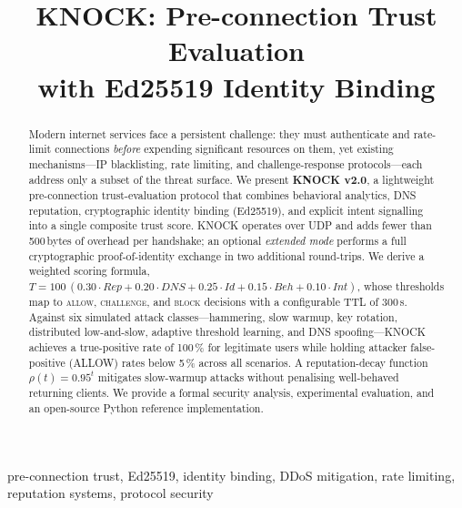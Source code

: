 \documentclass[10pt,conference]{IEEEtran}
\begin{document}
\title{KNOCK: Pre-connection Trust Evaluation\\
       with Ed25519 Identity Binding}

\author{
}

\maketitle

\begin{abstract}
Modern internet services face a persistent challenge: they must
authenticate and rate-limit connections \emph{before} expending
significant resources on them, yet existing mechanisms—IP blacklisting,
rate limiting, and challenge-response protocols—each address only a
subset of the threat surface.  We present \textbf{KNOCK v2.0}, a
lightweight pre-connection trust-evaluation protocol that combines
behavioral analytics, DNS reputation, cryptographic identity binding
(Ed25519), and explicit intent signalling into a single composite
trust score.  KNOCK operates over UDP and adds fewer than 500\,bytes of
overhead per handshake; an optional \emph{extended mode} performs a
full cryptographic proof-of-identity exchange in two additional
round-trips.  We derive a weighted scoring formula,
$T = 100\,(0.30 \cdot \mathit{Rep} + 0.20 \cdot \mathit{DNS}
         + 0.25 \cdot \mathit{Id} + 0.15 \cdot \mathit{Beh}
         + 0.10 \cdot \mathit{Int})$,
whose thresholds map to \textsc{allow}, \textsc{challenge}, and
\textsc{block} decisions with a configurable TTL of 300\,s.  Against
six simulated attack classes—hammering, slow warmup, key rotation,
distributed low-and-slow, adaptive threshold learning, and DNS
spoofing—KNOCK achieves a true-positive rate of 100\,\% for legitimate
users while holding attacker false-positive (ALLOW) rates below 5\,\%
across all scenarios.  A reputation-decay function $\rho(t)=0.95^{t}$
mitigates slow-warmup attacks without penalising well-behaved returning
clients.  We provide a formal security analysis, experimental
evaluation, and an open-source Python reference implementation.
\end{abstract}

\begin{IEEEkeywords}
pre-connection trust, Ed25519, identity binding, DDoS mitigation,
rate limiting, reputation systems, protocol security
\end{IEEEkeywords}
\end{document}
